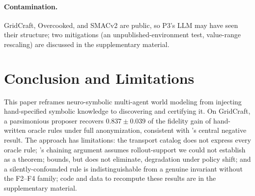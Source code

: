 \documentclass[letterpaper]{article} %
\let\autoref\Cref
\theoremstyle{plain}
\theoremstyle{definition}
\theoremstyle{remark}
\begin{document}
\paragraph{Contamination.} GridCraft, Overcooked, and SMACv2 are public, so P3's LLM may have seen their structure; two mitigations (an unpublished-environment test, value-range rescaling) are discussed in the supplementary material.

\section{Conclusion and Limitations}
\label{sec:conclusion}

This paper reframes neuro-symbolic multi-agent world modeling from injecting hand-specified symbolic knowledge to discovering and certifying it. On GridCraft, a parsimonious proposer recovers $0.837\pm0.039$ of the fidelity gain of hand-written oracle rules under full anonymization, consistent with \autoref{thm:t5}'s central negative result. The approach has limitations: the transport catalog does not express every oracle rule; \autoref{thm:t3}'s chaining argument assumes rollout-support we could not establish as a theorem; \autoref{thm:t4} bounds, but does not eliminate, degradation under policy shift; and a silently-confounded rule is indistinguishable from a genuine invariant without the F2--F4 family; code and data to recompute these results are in the supplementary material.


\end{document}
